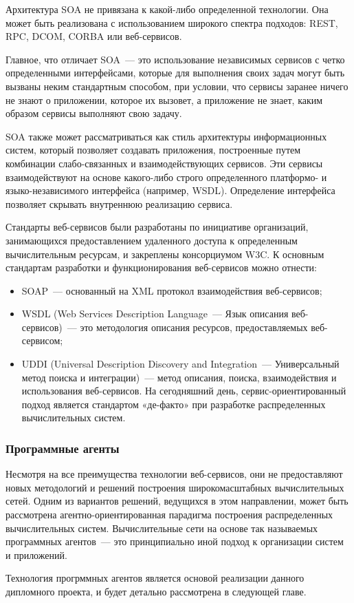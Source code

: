 Архитектура SOA не привязана к какой-либо определенной технологии. Она может быть реализована с использованием широкого спектра подходов: REST, RPC, DCOM, CORBA или веб-сервисов.

Главное, что отличает SOA~--- это использование независимых сервисов с четко определенными интерфейсами, которые для выполнения своих задач могут быть вызваны неким стандартным способом, при условии, что сервисы заранее ничего не знают о приложении, которое их вызовет, а приложение не знает, каким образом сервисы выполняют свою задачу.

SOA также может рассматриваться как стиль архитектуры информационных систем, который позволяет создавать приложения, построенные путем комбинации слабо-связанных и взаимодействующих сервисов. Эти сервисы взаимодействуют на основе какого-либо строго определенного платформо- и языко-независимого интерфейса (например, WSDL). Определение интерфейса позволяет скрывать внутреннюю реализацию сервиса.

Стандарты веб-сервисов были разработаны по инициативе организаций, занимающихся предоставлением удаленного доступа к определенным вычислительным ресурсам, и закреплены консорциумом W3C. К основным стандартам разработки и функционирования веб-сервисов можно отнести:
\begin{itemize}
\item SOAP~--- основанный на XML протокол взаимодействия веб-сервисов;
\item WSDL (Web Services Description Language~--- Язык описания веб-сервисов)~--- это методология описания ресурсов, предоставляемых веб-сервисом;
\item UDDI (Universal Description Discovery and Integration~--- Универсальный метод поиска и интеграции)~--- метод описания, поиска, взаимодействия и использования веб-сервисов. На сегодняшний день, сервис-ориентированный подход является стандартом «де-факто» при разработке распределенных вычислительных систем.
\end{itemize}

\subsubsection{Программные агенты}
Несмотря на все преимущества технологии веб-сервисов, они не предоставляют новых методологий и решений построения широкомасштабных вычислительных сетей. Одним из вариантов решений, ведущихся в этом направлении, может быть рассмотрена агентно-ориентированная парадигма построения распределенных вычислительных систем. Вычислительные сети на основе так называемых программных агентов~--- это принципиально иной подход к организации систем и приложений.

Технология прогрммных агентов является основой реализации данного дипломного проекта, и будет детально рассмотрена в следующей главе.

